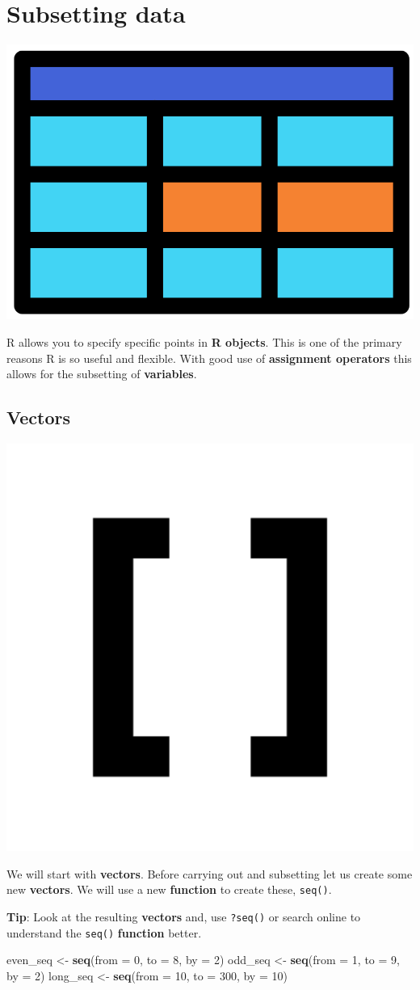 \documentclass[]{book}
\newenvironment{Shaded}{\begin{snugshade}}{\end{snugshade}}
\newcommand{\KeywordTok}[1]{\textcolor[rgb]{0.13,0.29,0.53}{\textbf{#1}}}
\newcommand{\DataTypeTok}[1]{\textcolor[rgb]{0.13,0.29,0.53}{#1}}
\newcommand{\DecValTok}[1]{\textcolor[rgb]{0.00,0.00,0.81}{#1}}
\newcommand{\StringTok}[1]{\textcolor[rgb]{0.31,0.60,0.02}{#1}}
\newcommand{\NormalTok}[1]{#1}
\begin{document}
\section{Subsetting data}\label{subsetting-data}

\begin{center}\includegraphics[width=0.2\linewidth]{figures/R_subset} \end{center}

R allows you to specify specific points in \textbf{R objects}. This is
one of the primary reasons R is so useful and flexible. With good use of
\textbf{assignment operators} this allows for the subsetting of
\textbf{variables}.

\subsection{Vectors}\label{vectors}

\begin{center}\includegraphics[width=0.2\linewidth]{figures/R_square_bracket} \end{center}

We will start with \textbf{vectors}. Before carrying out and subsetting
let us create some new \textbf{vectors}. We will use a new
\textbf{function} to create these, \texttt{seq()}.

\textbf{Tip}: Look at the resulting \textbf{vectors} and, use
\texttt{?seq()} or search online to understand the \texttt{seq()}
\textbf{function} better.

\begin{Shaded}
\begin{Highlighting}[]
\NormalTok{even_seq <-}\StringTok{ }\KeywordTok{seq}\NormalTok{(}\DataTypeTok{from =} \DecValTok{0}\NormalTok{, }\DataTypeTok{to =} \DecValTok{8}\NormalTok{, }\DataTypeTok{by =} \DecValTok{2}\NormalTok{)}
\NormalTok{odd_seq <-}\StringTok{ }\KeywordTok{seq}\NormalTok{(}\DataTypeTok{from =} \DecValTok{1}\NormalTok{, }\DataTypeTok{to =} \DecValTok{9}\NormalTok{, }\DataTypeTok{by =} \DecValTok{2}\NormalTok{)}
\NormalTok{long_seq <-}\StringTok{ }\KeywordTok{seq}\NormalTok{(}\DataTypeTok{from =} \DecValTok{10}\NormalTok{, }\DataTypeTok{to =} \DecValTok{300}\NormalTok{, }\DataTypeTok{by =} \DecValTok{10}\NormalTok{)}
\end{Highlighting}
\end{Shaded}
\end{document}
